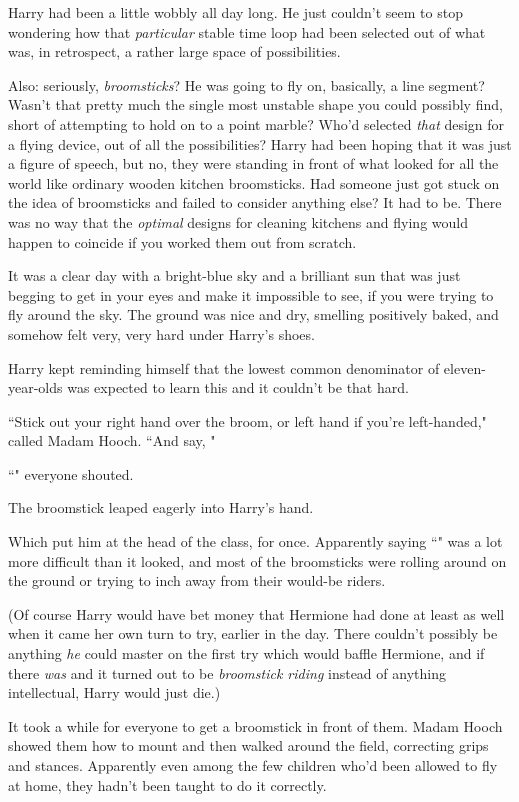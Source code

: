 Harry had been a little wobbly all day long. He just couldn't seem to stop wondering how that \emph{particular} stable time loop had been selected out of what was, in retrospect, a rather large space of possibilities.

Also: seriously, \emph{broomsticks}? He was going to fly on, basically, a line segment? Wasn't that pretty much the single most unstable shape you could possibly find, short of attempting to hold on to a point marble? Who'd selected \emph{that} design for a flying device, out of all the possibilities? Harry had been hoping that it was just a figure of speech, but no, they were standing in front of what looked for all the world like ordinary wooden kitchen broomsticks. Had someone just got stuck on the idea of broomsticks and failed to consider anything else? It had to be. There was no way that the \emph{optimal} designs for cleaning kitchens and flying would happen to coincide if you worked them out from scratch.

It was a clear day with a bright-blue sky and a brilliant sun that was just begging to get in your eyes and make it impossible to see, if you were trying to fly around the sky. The ground was nice and dry, smelling positively baked, and somehow felt very, very hard under Harry's shoes.

Harry kept reminding himself that the lowest common denominator of eleven-year-olds was expected to learn this and it couldn't be that hard.

``Stick out your right hand over the broom, or left hand if you're left-handed," called Madam Hooch. ``And say, "

``" everyone shouted.

The broomstick leaped eagerly into Harry's hand.

Which put him at the head of the class, for once. Apparently saying ``" was a lot more difficult than it looked, and most of the broomsticks were rolling around on the ground or trying to inch away from their would-be riders.

(Of course Harry would have bet money that Hermione had done at least as well when it came her own turn to try, earlier in the day. There couldn't possibly be anything \emph{he} could master on the first try which would baffle Hermione, and if there \emph{was} and it turned out to be \emph{broomstick riding} instead of anything intellectual, Harry would just die.)

It took a while for everyone to get a broomstick in front of them. Madam Hooch showed them how to mount and then walked around the field, correcting grips and stances. Apparently even among the few children who'd been allowed to fly at home, they hadn't been taught to do it correctly.

